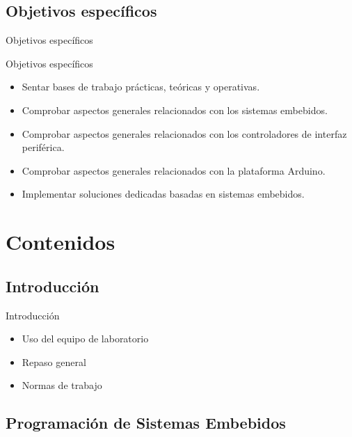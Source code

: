 \documentclass[handout,xcolor=dvipsnames]{beamer}
\newcommand{\pageframe}[1]{\frame{\begin{center}{ \Huge #1 }\end{center}}}
\begin{document}
\subsection{Objetivos específicos}

\begin{frame}{Objetivos específicos}
  \begin{block}{Objetivos específicos}
    \begin{itemize}
      \item<1> Sentar bases de trabajo prácticas, teóricas y operativas.
      \item<1> Comprobar aspectos generales relacionados con los sistemas embebidos.
      \item<1> Comprobar aspectos generales relacionados con los controladores de interfaz periférica.
      \item<1> Comprobar aspectos generales relacionados con la plataforma Arduino.
      \item<1> Implementar soluciones dedicadas basadas en sistemas embebidos.
    \end{itemize}
  \end{block}
\end{frame}


\section{Contenidos}

\pageframe{Contenidos}

\subsection[Introducción]{Introducción}

\begin{frame}{Introducción}
  \begin{block}{}
  \begin{itemize}
    \item Uso del equipo de laboratorio
    \item Repaso general
    \item Normas de trabajo
  \end{itemize}
  \end{block}
\end{frame}

\subsection[Embebidos]{Programación de Sistemas Embebidos}
\end{document}
